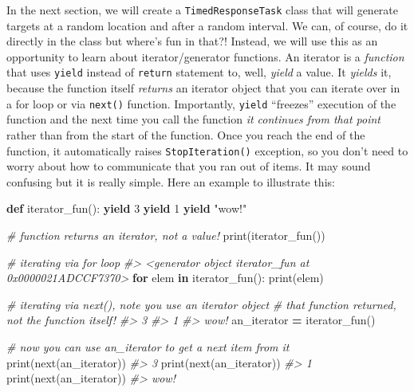 \documentclass[
]{book}
\newenvironment{Shaded}{\begin{snugshade}}{\end{snugshade}}
\newcommand{\BuiltInTok}[1]{#1}
\newcommand{\CommentTok}[1]{\textcolor[rgb]{0.56,0.35,0.01}{\textit{#1}}}
\newcommand{\ControlFlowTok}[1]{\textcolor[rgb]{0.13,0.29,0.53}{\textbf{#1}}}
\newcommand{\DecValTok}[1]{\textcolor[rgb]{0.00,0.00,0.81}{#1}}
\newcommand{\KeywordTok}[1]{\textcolor[rgb]{0.13,0.29,0.53}{\textbf{#1}}}
\newcommand{\NormalTok}[1]{#1}
\newcommand{\OperatorTok}[1]{\textcolor[rgb]{0.81,0.36,0.00}{\textbf{#1}}}
\newcommand{\StringTok}[1]{\textcolor[rgb]{0.31,0.60,0.02}{#1}}
\begin{document}
In the next section, we will create a \texttt{TimedResponseTask} class that will generate targets at a random location and after a random interval. We can, of course, do it directly in the class but where's fun in that?! Instead, we will use this as an opportunity to learn about iterator/generator functions. An iterator is a \emph{function} that uses \texttt{yield} instead of \texttt{return} statement to, well, \emph{yield} a value. It \emph{yields} it, because the function itself \emph{returns} an iterator object that you can iterate over in a for loop or via \texttt{next()} function. Importantly, \texttt{yield} ``freezes'' execution of the function and the next time you call the function \emph{it continues from that point} rather than from the start of the function. Once you reach the end of the function, it automatically raises \texttt{StopIteration()} exception, so you don't need to worry about how to communicate that you ran out of items. It may sound confusing but it is really simple. Here an example to illustrate this:

\begin{Shaded}
\begin{Highlighting}[]
\KeywordTok{def}\NormalTok{ iterator\_fun():}
    \ControlFlowTok{yield} \DecValTok{3}
    \ControlFlowTok{yield} \DecValTok{1}
    \ControlFlowTok{yield} \StringTok{"wow!"}
  
\CommentTok{\# function returns an iterator, not a value!}
\BuiltInTok{print}\NormalTok{(iterator\_fun())}

\CommentTok{\# iterating via for loop}
\CommentTok{\#\textgreater{} \textless{}generator object iterator\_fun at 0x0000021ADCCF7370\textgreater{}}
\ControlFlowTok{for}\NormalTok{ elem }\KeywordTok{in}\NormalTok{ iterator\_fun():}
    \BuiltInTok{print}\NormalTok{(elem)}
    
\CommentTok{\# iterating via next(), note you use an iterator object }
\CommentTok{\# that function returned, not the function itself!}
\CommentTok{\#\textgreater{} 3}
\CommentTok{\#\textgreater{} 1}
\CommentTok{\#\textgreater{} wow!}
\NormalTok{an\_iterator }\OperatorTok{=}\NormalTok{ iterator\_fun()  }

\CommentTok{\# now you can use an\_iterator to get a next item from it}
\BuiltInTok{print}\NormalTok{(}\BuiltInTok{next}\NormalTok{(an\_iterator))}
\CommentTok{\#\textgreater{} 3}
\BuiltInTok{print}\NormalTok{(}\BuiltInTok{next}\NormalTok{(an\_iterator))}
\CommentTok{\#\textgreater{} 1}
\BuiltInTok{print}\NormalTok{(}\BuiltInTok{next}\NormalTok{(an\_iterator))}
\CommentTok{\#\textgreater{} wow!}
\end{Highlighting}
\end{Shaded}
\end{document}

